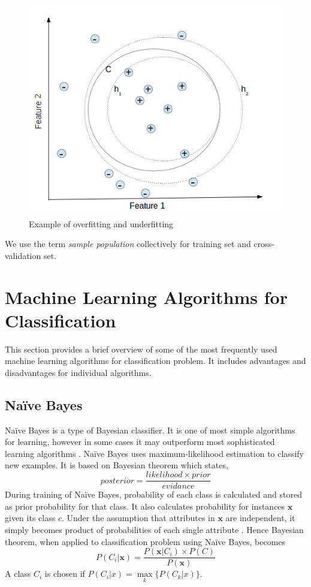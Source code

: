 \begin{figure}[h]
  \begin{center}
    \captionsetup{justification=centering}
    \includegraphics[scale=0.45]{figures/mlfitting.png}
    \caption{Example of overfitting and underfitting}
    \label{fig:mlfitting}
  \end{center}
\end{figure}

We use the term \emph{sample population} collectively for training set and cross-validation set.

\section{Machine Learning Algorithms for Classification}
\label{sec:c3mlclassification}
This section provides a brief overview of some of the most frequently used machine learning algorithms for classification problem. It includes advantages and disadvantages for individual algorithms.

\subsection{Na\"{i}ve Bayes}
Na\"{i}ve Bayes is a type of Bayesian classifier. It is one of most simple algorithms for learning, however in some cases it may outperform most sophisticated learning algorithms \cite{John1995}. Na\"{i}ve Bayes uses maximum-likelihood estimation to classify new examples. It is based on Bayesian theorem which states,
\[ posterior = \frac{likelihood \times prior}{evidance} \]
During training of Na\"{i}ve Bayes, probability of each class is calculated and stored as prior probability for that class. It also calculates probability for instances $\boldsymbol{x}$ given its class $c$. Under the assumption that attributes in $\boldsymbol{x}$ are independent, it simply becomes product of probabilities of each single attribute \cite{Williams2006}.
Hence Bayesian theorem, when applied to classification problem using Na\"{i}ve Bayes, becomes
\[ P(C_i|\boldsymbol{x}) = \frac{P(\boldsymbol{x}|C_i) \times P(C)}{P(\boldsymbol{x})}\]
A class $C_i$ is chosen if $P(C_i|x) = \max\limits_{k} \{ P(C_k|x)\}$.


